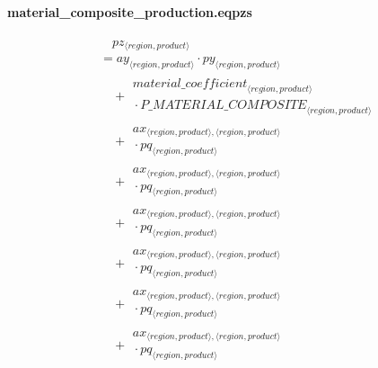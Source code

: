 \documentclass[11pt]{article}
\begin{document}
\paragraph{material\_composite\_production.eqpzs}
\begin{align*}
&\quad pz_{\langle region, product\rangle}\\
&= ay_{\langle region, product\rangle} \cdot py_{\langle region, product\rangle}\\
&\quad {}+ \begin{aligned}
{material\_coefficient}_{\langle region, product\rangle}\\
{}\cdot {P\_MATERIAL\_COMPOSITE}_{\langle region, product\rangle}
\end{aligned}\\
&\quad {}+ \begin{aligned}
ax_{\langle region, product\rangle,\langle region, product\rangle}\\
{}\cdot pq_{\langle region, product\rangle}
\end{aligned}\\
&\quad {}+ \begin{aligned}
ax_{\langle region, product\rangle,\langle region, product\rangle}\\
{}\cdot pq_{\langle region, product\rangle}
\end{aligned}\\
&\quad {}+ \begin{aligned}
ax_{\langle region, product\rangle,\langle region, product\rangle}\\
{}\cdot pq_{\langle region, product\rangle}
\end{aligned}\\
&\quad {}+ \begin{aligned}
ax_{\langle region, product\rangle,\langle region, product\rangle}\\
{}\cdot pq_{\langle region, product\rangle}
\end{aligned}\\
&\quad {}+ \begin{aligned}
ax_{\langle region, product\rangle,\langle region, product\rangle}\\
{}\cdot pq_{\langle region, product\rangle}
\end{aligned}\\
&\quad {}+ \begin{aligned}
ax_{\langle region, product\rangle,\langle region, product\rangle}\\
{}\cdot pq_{\langle region, product\rangle}

\end{aligned}
\end{align*}
\end{document}

